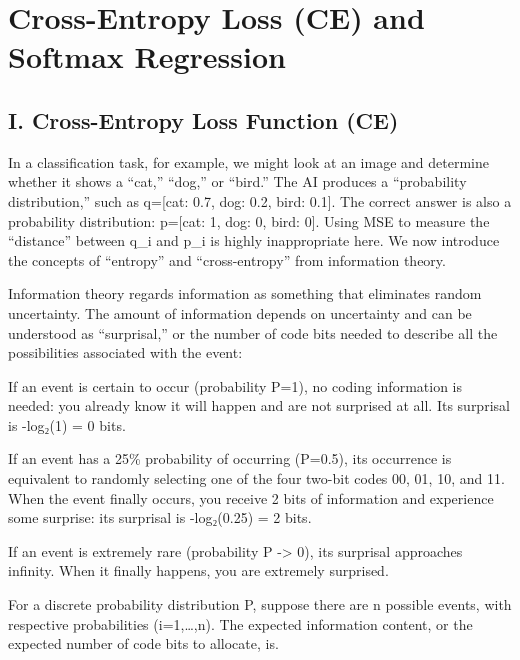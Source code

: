 \setcounter{section}{4}

\hypertarget{cross-entropy-loss-ce-and-softmax-regression}{%
\section{Cross-Entropy Loss (CE) and Softmax Regression}\label{cross-entropy-loss-ce-and-softmax-regression}}

\hypertarget{i.-cross-entropy-loss-function-ce}{%
\subsection{I. Cross-Entropy Loss Function (CE)}\label{i.-cross-entropy-loss-function-ce}}

In a classification task, for example, we might look at an image and determine whether it shows a ``cat,'' ``dog,'' or ``bird.'' The AI produces a ``probability distribution,'' such as q={[}cat: 0.7, dog: 0.2, bird: 0.1{]}. The correct answer is also a probability distribution: p={[}cat: 1, dog: 0, bird: 0{]}. Using MSE to measure the ``distance'' between q\_i and p\_i is highly inappropriate here. We now introduce the concepts of ``entropy'' and ``cross-entropy'' from information theory.

Information theory regards information as something that eliminates random uncertainty. The amount of information depends on uncertainty and can be understood as ``surprisal,'' or the number of code bits needed to describe all the possibilities associated with the event:

If an event is certain to occur (probability P=1), no coding information is needed: you already know it will happen and are not surprised at all. Its surprisal is -log₂(1) = 0 bits.

If an event has a 25\% probability of occurring (P=0.5), its occurrence is equivalent to randomly selecting one of the four two-bit codes 00, 01, 10, and 11. When the event finally occurs, you receive 2 bits of information and experience some surprise: its surprisal is -log₂(0.25) = 2 bits.

If an event is extremely rare (probability P -\textgreater{} 0), its surprisal approaches infinity. When it finally happens, you are extremely surprised.

For a discrete probability distribution P, suppose there are n possible events, with respective probabilities (i=1,\ldots,n). The expected information content, or the expected number of code bits to allocate, is.

